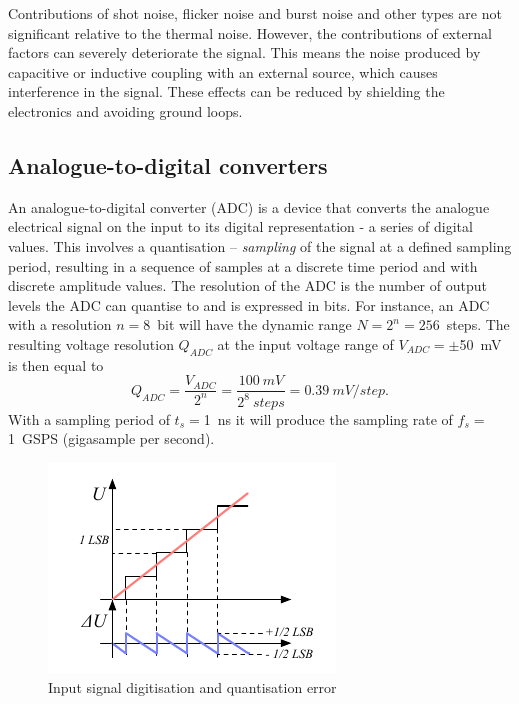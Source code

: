 \documentclass[12pt]{mytustyle}  %
\begin{document}
Contributions of shot noise, flicker noise and burst noise and other types are not significant relative to the thermal noise. However, the contributions of external factors can severely deteriorate the signal. This means the noise produced by capacitive or inductive coupling with an external source, which causes interference in the signal. These effects can be reduced by shielding the electronics and avoiding ground loops. 

\subsection{Analogue-to-digital converters}
An analogue-to-digital converter (ADC) is a device that converts the analogue electrical signal on the input to its digital representation - a series of digital values. This involves a quantisation -- \emph{sampling} of the signal at a defined sampling period, resulting in a sequence of samples at a discrete time period and with discrete amplitude values. The resolution of the ADC is the number of output levels the ADC can quantise to and is expressed in bits. For instance, an ADC with a resolution $n=8$~bit will have the dynamic range $N=2^n=256$~steps. The resulting voltage resolution $Q_{ADC}$ at the input voltage range of $V_{ADC}=\pm$50~mV is then equal to 
\begin{equation}
\label{eq:mvpercnt}
Q_{ADC}=\frac{V_{ADC}}{2^{n}}  = \frac{100~mV}{2^8~steps} = 0.39~mV/step.
\end{equation} 
With a sampling period of $t_s=$1~ns it will produce the sampling rate of $f_s=$1~GSPS (gigasample per second).
\begin{figure}[!t]
\begin{center}
\includegraphics[width=0.55\linewidth]{plots/qerr}
\caption{Input signal digitisation and quantisation error}
\label{fig:qerr}
\end{center}
\end{figure}
\end{document}
